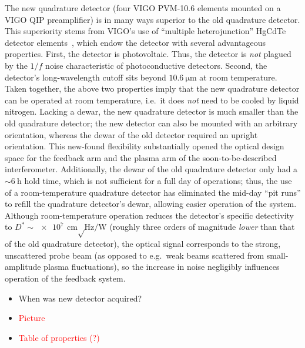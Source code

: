 The new quadrature detector
(four VIGO PVM-10.6 elements mounted on a VIGO QIP preamplifier)
is in many ways superior to the old quadrature detector.
This superiority stems from VIGO's use of
``multiple heterojunction'' HgCdTe detector elements~\cite{vigo_catalog},
which endow the detector with several advantageous properties.
First, the detector is photovoltaic.
Thus, the detector is \emph{not} plagued by the $1 / f$ noise
characteristic of photoconductive detectors.
Second, the detector's long-wavelength cutoff
sits beyond $\SI{10.6}{\micro\meter}$ at room temperature.
Taken together, the above two properties imply that
the new quadrature detector can be operated at room temperature,
i.e.\ it does \emph{not} need to be cooled by liquid nitrogen.
Lacking a dewar, the new quadrature detector
is much smaller than the old quadrature detector;
the new detector can also be mounted with an arbitrary orientation,
whereas the dewar of the old detector required an upright orientation.
This new-found flexibility substantially opened
the optical design space for the feedback arm and
the plasma arm of the soon-to-be-described interferometer.
Additionally, the dewar of the old quadrature detector
only had a $\sim \SI{6}{\hour}$ hold time,
which is not sufficient for a full day of \diiid \space operations;
thus, the use of a room-temperature quadrature detector has
eliminated the mid-day ``pit runs'' to refill the quadrature detector's dewar,
allowing easier operation of the system.
Although room-temperature operation reduces
the detector's specific detectivity to
$D^* \sim \SI{e7}{\centi\meter \sqrt\hertz \per\watt}$
(roughly three orders of magnitude \emph{lower} than
that of the old quadrature detector),
the optical signal corresponds to the strong, unscattered probe beam
(as opposed to e.g.\ weak beams
scattered from small-amplitude plasma fluctuations), so
the increase in noise negligibly influences operation of the feedback system.

\begin{itemize}
  \item When was new detector acquired?
  \item \textcolor{red}{Picture}
  \item \textcolor{red}{Table of properties (?)}
\end{itemize}


